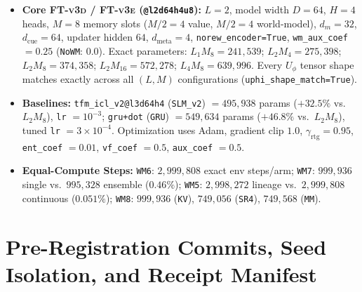 \documentclass[11pt]{article}
\newcommand{\Uphi}{U_\phi}
\newcommand{\ftd}{\textsc{FT-v3d}}
\newcommand{\fte}{\textsc{FT-v3e}}
\begin{document}
\begin{itemize}
  \item \textbf{Core \ftd{} / \fte{} (\texttt{@l2d64h4u8}):} $L{=}2$, model width $D{=}64$, $H{=}4$ heads, $M{=}8$ memory slots ($M/2{=}4$ value, $M/2{=}4$ world-model), $d_m{=}32$, $d_{\text{cue}}{=}64$, updater hidden $64$, $d_{\text{meta}}{=}4$, \texttt{norew\_encoder=True}, \texttt{wm\_aux\_coef} $=0.25$ (\texttt{NoWM}: $0.0$). Exact parameters: $L_1M_8 = 241{,}539$; $L_2M_4 = 275{,}398$; $L_2M_8 = 374{,}358$; $L_2M_{16} = 572{,}278$; $L_4M_8 = 639{,}996$. Every $\Uphi$ tensor shape matches exactly across all $(L, M)$ configurations (\texttt{uphi\_shape\_match=True}).
  \item \textbf{Baselines:} \texttt{tfm\_icl\_v2@l3d64h4} (\texttt{SLM\_v2}) $= 495{,}938$ params ($+32.5\%$ vs.\ $L_2M_8$), \texttt{lr} $=10^{-3}$; \texttt{gru+dot} (\texttt{GRU}) $= 549{,}634$ params ($+46.8\%$ vs.\ $L_2M_8$), tuned \texttt{lr} $=3\times 10^{-4}$. Optimization uses Adam, gradient clip $1.0$, $\gamma_{\text{rtg}}=0.95$, \texttt{ent\_coef} $=0.01$, \texttt{vf\_coef} $=0.5$, \texttt{aux\_coef} $=0.5$.
  \item \textbf{Equal-Compute Steps:} \texttt{WM6}: $2{,}999{,}808$ exact env steps/arm; \texttt{WM7}: $999{,}936$ single vs.\ $995{,}328$ ensemble ($0.46\%$); \texttt{WM5}: $2{,}998{,}272$ lineage vs.\ $2{,}999{,}808$ continuous ($0.051\%$); \texttt{WM8}: $999{,}936$ (\texttt{KV}), $749{,}056$ (\texttt{SR4}), $749{,}568$ (\texttt{MM}).
\end{itemize}

\section{Pre-Registration Commits, Seed Isolation, and Receipt Manifest}
\label{app:manifest}
\end{document}
